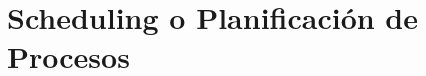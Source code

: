 \documentclass[../main.tex]{subfiles}
\begin{document}
\section{Scheduling o Planificación de Procesos}
   
		          
\end{document}
